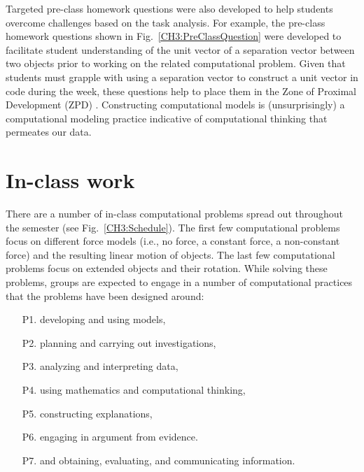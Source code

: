 \documentclass{msuphddissertation}
\begin{document}
\begin{doublespace}
Targeted pre-class homework questions were also developed to help students overcome challenges based on the task analysis.  For example, the pre-class homework questions shown in Fig.~\ref{CH3:PreClassQuestion} were developed to facilitate student understanding of the unit vector of a separation vector between two objects prior to working on the related computational problem.  Given that students must grapple with using a separation vector to construct a unit vector in code during the week, these questions help to place them in the Zone of Proximal Development (ZPD) \cite{Vygotsky1980}.  Constructing computational models is (unsurprisingly) a computational modeling practice indicative of computational thinking that permeates our data.

\section{In-class work}\label{CH3:InClassWork}

There are a number of in-class computational problems spread out throughout the semester (see Fig.~\ref{CH3:Schedule}).  The first few computational problems focus on different force models (i.e., no force, a constant force, a non-constant force) and the resulting linear motion of objects.  The last few computational problems focus on extended objects and their rotation.  While solving these problems, groups are expected to engage in a number of computational practices that the problems have been designed around: \begin{enumerate}
\item[P1.] developing and using models,
\item[P2.] planning and carrying out investigations,
\item[P3.] analyzing and interpreting data,
\item[P4.] using mathematics and computational thinking,
\item[P5.] constructing explanations,
\item[P6.] engaging in argument from evidence.
\item[P7.] and obtaining, evaluating, and communicating information.
\end{enumerate}


\end{doublespace}
\end{document}
